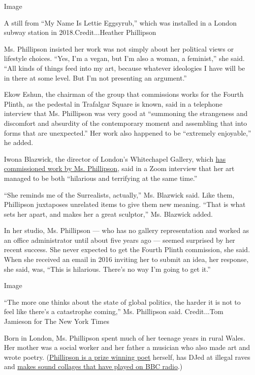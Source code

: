 Image

A still from ``My Name Is Lettie Eggsyrub,'' which was installed in a
London subway station in 2018.Credit...Heather Phillipson

Ms. Phillipson insisted her work was not simply about her political
views or lifestyle choices. ``Yes, I'm a vegan, but I'm also a woman, a
feminist,'' she said. ``All kinds of things feed into my art, because
whatever ideologies I have will be in there at some level. But I'm not
presenting an argument.''

Ekow Eshun, the chairman of the group that commissions works for the
Fourth Plinth, as the pedestal in Trafalgar Square is known, said in a
telephone interview that Ms. Phillipson was very good at ``summoning the
strangeness and discomfort and absurdity of the contemporary moment and
assembling that into forms that are unexpected.'' Her work also happened
to be ``extremely enjoyable,'' he added.

Iwona Blazwick, the director of London's Whitechapel Gallery, which
\href{https://www.whitechapelgallery.org/exhibitions/heather-phillipson/}{has
commissioned work by Ms. Phillipson}, said in a Zoom interview that her
art managed to be both ``hilarious and terrifying at the same time.''

``She reminds me of the Surrealists, actually,'' Ms. Blazwick said. Like
them, Phillipson juxtaposes unrelated items to give them new meaning.
``That is what sets her apart, and makes her a great sculptor,'' Ms.
Blazwick added.

In her studio, Ms. Phillipson --- who has no gallery representation and
worked as an office administrator until about five years ago --- seemed
surprised by her recent success. She never expected to get the Fourth
Plinth commission, she said. When she received an email in 2016 inviting
her to submit an idea, her response, she said, was, ``This is hilarious.
There's no way I'm going to get it.''

Image

``The more one thinks about the state of global politics, the harder it
is not to feel like there's a catastrophe coming,'' Ms. Phillipson said.
Credit...Tom Jamieson for The New York Times

Born in London, Ms. Phillipson spent much of her teenage years in rural
Wales. Her mother was a social worker and her father a musician who also
made art and wrote poetry.
(\href{https://www.nytimes.com/2016/02/11/t-magazine/art/heather-phillipson-british-artist.html}{Phillipson
is a prize winning poet} herself, has DJed at illegal raves and
\href{https://www.bbc.co.uk/programmes/m000gdzs}{makes sound collages
that have played on BBC radio}.)

